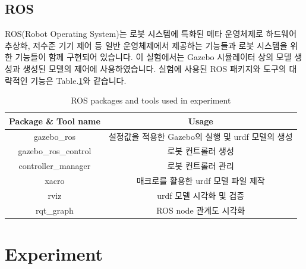 \documentclass{article}
\begin{document}
		\subsection{ROS}
		ROS(Robot Operating System)는 로봇 시스템에 특화된 메타 운영체제로 하드웨어 추상화, 저수준 기기 제어 등 일반 운영체제에서 제공하는 기능들과 로봇 시스템을 위한 기능들이 함께 구현되어 있습니다. 이 실험에서는 Gazebo 시뮬레이터 상의 모델 생성과 생성된 모델의 제어에 사용하였습니다. 실험에 사용된 ROS 패키지와 도구의 대략적인 기능은 Table.\ref{table:rospackages}와 같습니다.
		
		\begin{table}[h]
		\centering
		\caption{ROS packages and tools used in experiment}
		\begin{tabular}{c|c}
			\textbf{Package \& Tool name} & \textbf{Usage}   \\
			\hline
			gazebo\_ros & 설정값을 적용한 Gazebo의 실행 및 urdf 모델의 생성\\
			\hline
			gazebo\_ros\_control & 로봇 컨트롤러 생성\\
			\hline
			controller\_manager & 로봇 컨트롤러 관리\\
			\hline
			xacro & 매크로를 활용한 urdf 모델 파일 제작\\
			\hline
			rviz & urdf 모델 시각화 및 검증\\
			\hline
			rqt\_graph & ROS node 관계도 시각화\\
		\end{tabular}
		\label{table:rospackages}
		\end{table}
		
	\section{Experiment}
\end{document}
